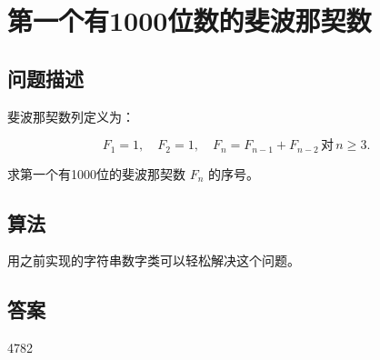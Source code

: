 \section{第一个有1000位数的斐波那契数}
\subsection{问题描述}
\begin{tcolorbox}

斐波那契数列定义为：

\[
F_1 = 1, \quad F_2 = 1, \quad F_n = F_{n-1} + F_{n-2} \, \text{对} \, n \geq 3.
\]

求第一个有1000位的斐波那契数 \( F_n \) 的序号。
\end{tcolorbox}

\subsection{算法}
用之前实现的字符串数字类可以轻松解决这个问题。

\subsection{答案}
4782
